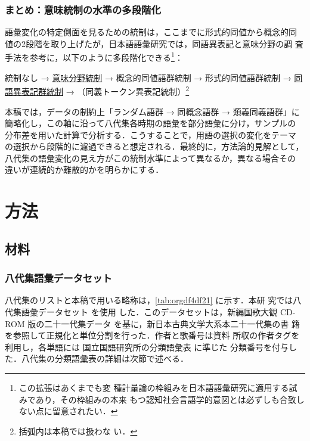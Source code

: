 \documentclass[submit]{ipsj}
\renewcommand{\ref}{\cref}
\begin{document}
\subsubsection{まとめ：意味統制の水準の多段階化}
\label{sec:org5676a3f}
語彙変化の特定側面を見るための統制は，ここまでに形式的同値から概念的同
値の2段階を取り上げたが，日本語語彙研究では，同語異表記と意味分野の調
査手法を参考に，以下のように多段階化できる\footnote{この拡張はあくまでも変
種計量論の枠組みを日本語語彙研究に適用する試みであり，その枠組みの本来
もつ認知社会言語学的意図とは必ずしも合致しない点に留意されたい．}：

統制なし → \uline{意味分野統制} → 概念的同値語群統制 → 形式的同値語群統制 → \uline{同
語異表記群統制} → （同義トークン異表記統制）\footnote{括弧内は本稿では扱わな
い．}

本稿では，データの制約上「ランダム語群 → 同概念語群 → 類義同義語群」に
簡略化し，この軸に沿って八代集各時期の語彙を部分語彙に分け，サンプルの
分布差を用いた計算で分析する．こうすることで，用語の選択の変化をテーマ
の選択から段階的に濾過できると想定される．最終的に，方法論的見解として，
八代集の語彙変化の見え方がこの統制水準によって異なるか，異なる場合その
違いが連続的か離散的かを明らかにする．
\section{方法\label{org02c643b}}
\label{sec:org0bc46cb}
\subsection{材料\label{org2e7dab5}}
\label{sec:org807f776}
\subsubsection{八代集語彙データセット\label{orgf4b25a8}}
\label{sec:orgbe2303d}
八代集のリストと本稿で用いる略称は，\ref{tab:orgdf4df21} に示す．本研
究では八代集語彙データセット \cite{Hodoscek2022Developmenta}を使用
した．このデータセットは，新編国歌大観 CD-ROM 版の二十一代集データ
\cite{shinhen1996CDROM} を基に，新日本古典文学大系本二十一代集の書
籍を参照して正規化と単位分割を行った．作者と歌番号は資料
\cite{nakamura1999Kokubungaku} 所収の作者タグを利用し，各単語には
国立国語研究所の分類語彙表 \cite{nakano1994Bunruigoihyo} に準じた
分類番号を付与した．八代集の分類語彙表の詳細は次節で述べる．
\end{document}
